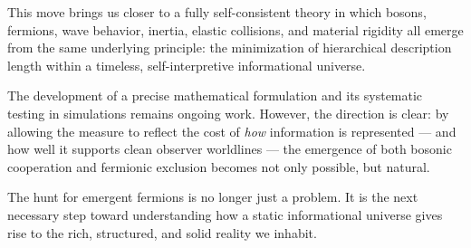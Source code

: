 This move brings us closer to a fully self-consistent theory in which bosons, fermions, wave behavior, inertia, elastic collisions, and material rigidity all emerge from the same underlying principle: the minimization of hierarchical description length within a timeless, self-interpretive informational universe.

The development of a precise mathematical formulation and its systematic testing in simulations remains ongoing work.
However, the direction is clear: by allowing the measure to reflect the cost of \emph{how} information is represented — and how well it supports clean observer worldlines — the emergence of both bosonic cooperation and fermionic exclusion becomes not only possible, but natural.

The hunt for emergent fermions is no longer just a problem.
It is the next necessary step toward understanding how a static informational universe gives rise to the rich, structured, and solid reality we inhabit.
